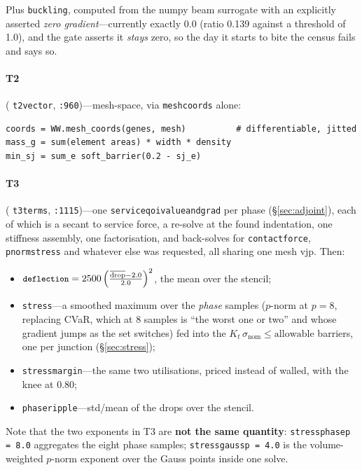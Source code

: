 \documentclass[11pt,a4paper]{article}
\DeclareRobustCommand{\code}[1]{%
  \texttt{\small\def\_{\textunderscore\discretionary{}{}{}}#1}}
\begin{document}
Plus \code{buckling}, computed from the numpy beam surrogate with an explicitly
asserted \emph{zero gradient}---currently exactly 0.0 (ratio 0.139 against a threshold
of 1.0), and the gate asserts it \emph{stays} zero, so the day it starts to bite the
census fails and says so.

\paragraph{T2} (\code{t2\_vector}, \code{:960})---mesh-space, via \code{mesh\_coords}
alone:

\begin{lstlisting}[style=py]
coords = WW.mesh_coords(genes, mesh)          # differentiable, jitted
mass_g = sum(element areas) * width * density
min_sj = sum_e soft_barrier(0.2 - sj_e)
\end{lstlisting}

\paragraph{T3} (\code{t3\_terms}, \code{:1115})---one
\code{service\_qoi\_value\_and\_grad} per phase (\S\ref{sec:adjoint}), each of which is
a secant to service force, a re-solve at the found indentation, one stiffness assembly,
one factorisation, and back-solves for \code{contact\_force}, \code{pnorm\_stress} and
whatever else was requested, all sharing one mesh vjp. Then:

\begin{itemize}
\item $\code{deflection} = 2500 \left(\frac{\overline{\mathrm{drop}} - 2.0}{2.0}\right)^2$,
  the mean over the stencil;
\item \code{stress}---a smoothed maximum over the \emph{phase} samples ($p$-norm at
  $p = 8$, replacing CVaR, which at 8 samples is ``the worst one or two'' and whose
  gradient jumps as the set switches) fed into the
  $K_t\,\sigma_{\text{nom}} \le \mathrm{allowable}$ barriers, one per junction
  (\S\ref{sec:stress});
\item \code{stress\_margin}---the same two utilisations, priced instead of walled, with
  the knee at 0.80;
\item \code{phase\_ripple}---std/mean of the drops over the stencil.
\end{itemize}

Note that the two exponents in T3 are \textbf{not the same quantity}:
\code{stress\_phase\_p = 8.0} aggregates the eight phase samples;
\code{stress\_gauss\_p = 4.0} is the volume-weighted $p$-norm exponent over the Gauss
points inside one solve.
\end{document}
